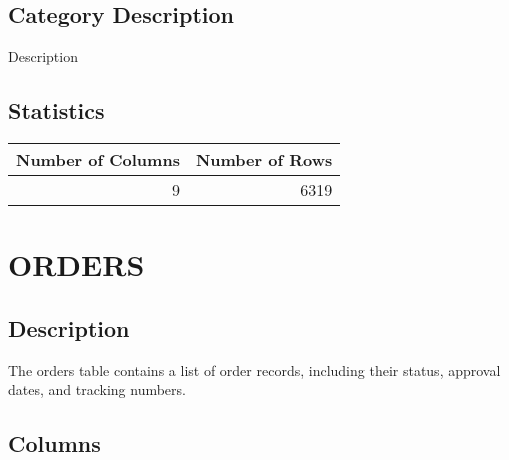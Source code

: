 \documentclass[
  letterpaper,
  DIV=11,
  numbers=noendperiod]{scrreprt}
\begin{document}
\hypertarget{category-description-23}{%
\section*{Category Description}\label{category-description-23}}

Description

\hypertarget{statistics-23}{%
\section*{Statistics}\label{statistics-23}}

\begin{longtable}{rr}
\toprule
Number of Columns & Number of Rows \\ 
\midrule
9 & 6319 \\ 
\bottomrule
\end{longtable}

\hypertarget{orders}{%
\chapter*{ORDERS}\label{orders}}

\hypertarget{description-24}{%
\section*{Description}\label{description-24}}

The orders table contains a list of order records, including their
status, approval dates, and tracking numbers.

\hypertarget{columns-24}{%
\section*{Columns}\label{columns-24}}
\end{document}
